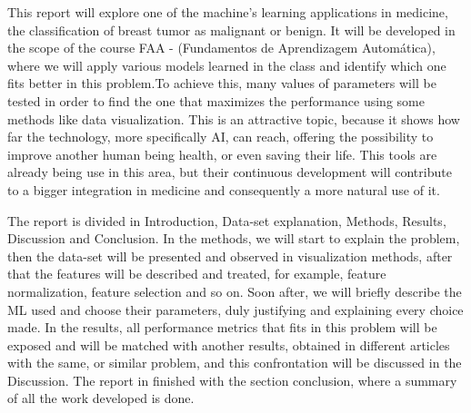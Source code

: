 \documentclass[12pt,a4paper,twocolumn]{article}
\begin{document}
\par This report will explore one of the machine's learning applications in medicine, the classification of  breast tumor as malignant or benign. It will be developed in the scope of the course FAA - (Fundamentos de Aprendizagem Automática), where we will apply various models learned in the class and identify which one fits better in this problem.To achieve this, many values of parameters will be tested in order to find the one that maximizes the performance using some methods like data visualization. This  is an attractive topic, because it shows how far the technology, more specifically AI, can reach, offering the possibility to improve another human being health, or even saving their life. This tools are already being use in this area, but their continuous development will contribute to a bigger integration in medicine and consequently a more natural use of it.\par
The report is divided in Introduction, Data-set explanation, Methods, Results, Discussion and Conclusion. In the methods, we will start to explain the problem, then the data-set will be presented and observed in visualization methods, after that the features will be described and  treated, for example, feature normalization, feature selection and so on. Soon after, we will briefly describe the ML used and choose their parameters, duly justifying  and explaining every choice made. In the results, all performance metrics that fits in this problem will be exposed and will  be matched with another results, obtained in different articles with the same, or similar problem, and this confrontation will be discussed in the Discussion. The report in finished with the section conclusion, where a  summary of all the work developed is done. 
\end{document}
